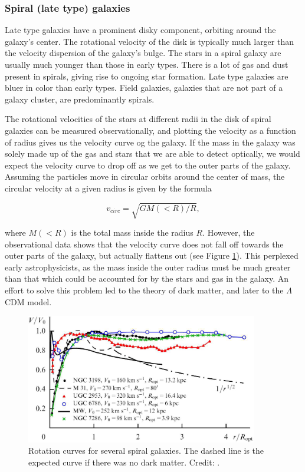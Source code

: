 \subsubsection{Spiral (late type) galaxies} \label{earlies}
Late type galaxies have a prominent disky component, orbiting around the galaxy's center. The rotational velocity of the disk is typically much larger than the velocity dispersion of the galaxy's bulge. The stars in a spiral galaxy are usually much younger than those in early types. There is a lot of gas and dust present in spirals, giving rise to ongoing star formation. Late type galaxies are bluer in color than early types. Field galaxies, galaxies that are not part of a galaxy cluster, are predominantly spirals. 


The rotational velocities of the stars at different radii in the disk of spiral galaxies can be measured observationally, and plotting the velocity as a function of radius gives us the velocity curve og the galaxy. If the mass in the galaxy was solely made up of the gas and stars that we are able to detect optically, we would expect the velocity curve to drop off as we get to the outer parts of the galaxy. Assuming the particles move in circular orbits around the center of mass, the circular velocity at a given radius is given by the formula

\begin{equation}
    v_{circ} = \sqrt{GM(<R)/R}, 
\end{equation}

where $M(<R)$ is the total mass inside the radius $R$. However, the observational data shows that the velocity curve does not fall off towards the outer parts of the galaxy, but actually flattens out (see Figure \ref{rotation_curves}). This perplexed early astrophysicists, as the mass inside the outer radius must be much greater than that which could be accounted for by the stars and gas in the galaxy. An effort to solve this problem led to the theory of dark matter, and later to the $\Lambda$CDM model.

\begin{figure}
    \centering
    \includegraphics[width=0.9\textwidth]{images/rotation_curves.png}
    \caption{Rotation curves for several spiral galaxies. The dashed line is the expected curve if there was no dark matter. Credit: \cite{Zasov2017}.}
    \label{rotation_curves}
\end{figure}

